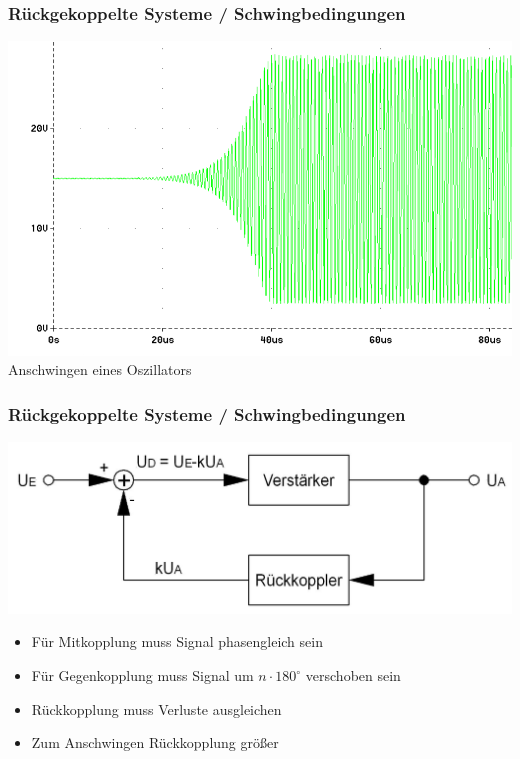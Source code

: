 \begin{frame}
  \frametitle{Rückgekoppelte Systeme / Schwingbedingungen}
  \begin{center}
    \includegraphics[width=1\textwidth,height=.6\textheight,keepaspectratio]{a07/Oszillator_Anschwingen.png}
    {\tiny \hyperlink{refs}{\cite{wm}}} \\[2em]
    Anschwingen eines Oszillators
  \end{center}
\end{frame}

\begin{frame}
  \frametitle{Rückgekoppelte Systeme / Schwingbedingungen}
  \begin{center}
    \includegraphics[width=1\textwidth,height=.5\textheight,keepaspectratio]{a07/Gegenkopplung.png}
    {\tiny \hyperlink{refs}{\cite{wm}}} \\[2em]
  \end{center}
  \begin{itemize}
    \item Für Mitkopplung muss Signal phasengleich sein
    \item Für Gegenkopplung muss Signal um $n \cdot 180^{\circ}$ verschoben sein
    \item Rückkopplung muss Verluste ausgleichen
    \item Zum Anschwingen Rückkopplung größer
  \end{itemize}
\end{frame}

